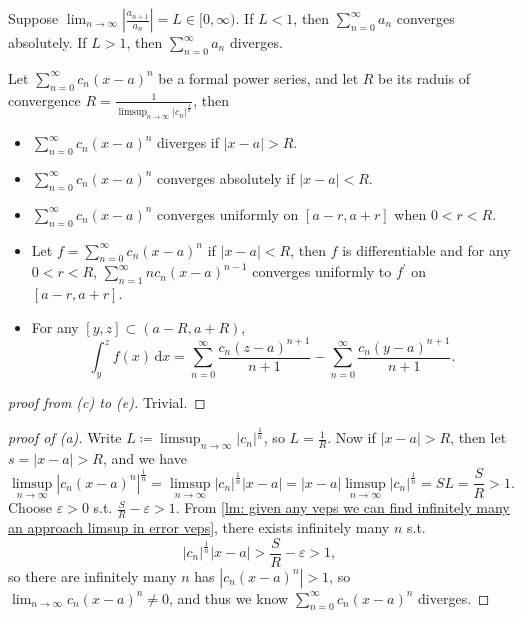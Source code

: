 \begin{theorem} \label{thm: Ratio test}
    Suppose \(\lim_{n \to \infty} \left\vert \frac{a_{n+1}}{a_n} \right\vert = L \in [0, \infty )\). If \(L < 1\), then \(\sum_{n=0}^{\infty} a_n \) converges absolutely. If \(L > 1\), then \(\sum_{n=0}^{\infty} a_n \) diverges.     
\end{theorem}

\begin{theorem}
    Let \(\sum_{n=0}^{\infty} c_n (x - a)^n \) be a formal power series, and let \(R\) be its raduis of convergence \(R = \frac{1}{\limsup_{n \to \infty} \vert c_n \vert^{\frac{1}{n}}  }\), then 
    \begin{itemize}
        \item [(a)] \(\sum_{n=0}^{\infty} c_n (x - a)^n \) diverges if \(\vert x-a \vert > R \). 
        \item [(b)] \(\sum_{n=0}^{\infty} c_n (x - a)^n \) converges absolutely if \(\vert x-a \vert < R \). 
        \item [(c)] \(\sum_{n=0}^{\infty} c_n (x - a)^n \) converges uniformly on \([a-r, a+r]\) when \(0 < r < R\). 
        \item [(d)] Let \(f = \sum_{n=0}^{\infty} c_n (x-a)^n \) if \(\vert x-a \vert < R \), then \(f\) is differentiable and for any \(0<r<R\), \(\sum_{n=1}^{\infty} n c_n (x-a)^{n-1} \) converges uniformly to \(f^{\prime} \) on \([a-r, a+r]\). 
        \item [(e)] For any \([y, z] \subset (a-R, a+R)\), 
        \[
            \int _y^z f(x) \, \mathrm{d} x = \sum_{n=0}^{\infty} \frac{c_n (z-a)^{n+1}}{n+1} - \sum_{n=0}^{\infty } \frac{c_n(y-a)^{n+1}}{n+1}.   
        \]
    \end{itemize}   
\end{theorem}
\begin{proof}[proof from (c) to (e)]
   Trivial. 
\end{proof}
\begin{proof}[proof of (a)]
    Write \(L\coloneqq \limsup_{n \to \infty} \vert c_n \vert^{\frac{1}{n}}  \), so \(L = \frac{1}{R}\). Now if \(\vert x - a \vert > R \), then let \(s = \vert x - a \vert > R \), and we have 
    \[
        \limsup_{n \to \infty} \left\vert c_n (x - a)^n \right\vert^{\frac{1}{n}} = \limsup_{n \to \infty} \vert c_n \vert^{\frac{1}{n}} \vert x - a \vert = \vert x - a \vert \limsup_{n \to \infty} \vert c_n \vert^{\frac{1}{n}} = SL = \frac{S}{R} > 1.  
    \] Choose \(\varepsilon > 0\) s.t. \(\frac{S}{R} - \varepsilon  > 1\). From \autoref{lm: given any veps we can find infinitely many an approach limsup in error veps}, there exists infinitely many \(n\) s.t. 
    \[
        \left\vert c_n \right\vert^{\frac{1}{n}} \vert x - a \vert > \frac{S}{R} - \varepsilon > 1,  
    \] so there are infinitely many \(n\) has \(\left\vert c_n (x-a)^n \right\vert > 1\), so \(\lim_{n \to \infty} c_n (x - a)^n \neq 0 \), and thus we know \(\sum_{n=0}^{\infty} c_n (x - a)^n \) diverges.           
\end{proof}

